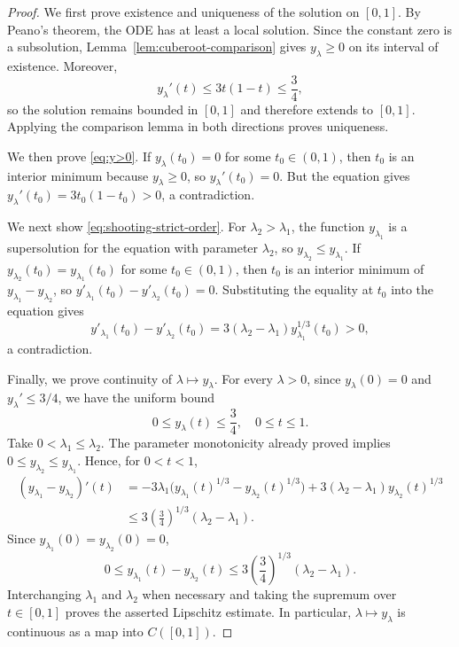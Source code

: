 \documentclass[a4paper,fleqn]{cas-sc}
\numberwithin{equation}{section}
\theoremstyle{plain}
\theoremstyle{definition}
\begin{document}
\begin{proof}
We first prove existence and uniqueness of the solution on $[0,1]$.  By
Peano's theorem, the ODE has at least a local solution.  Since the constant
zero is a
subsolution, Lemma~\ref{lem:cuberoot-comparison} gives \(y_\lambda\ge0\) on its
interval of existence.  Moreover,
\[
 y_\lambda'(t)\le3t(1-t)\le\frac34,
\]
so the solution remains bounded in \([0,1]\) and therefore extends to \([0,1]\).  Applying
the comparison lemma in both directions proves uniqueness.

We then prove \eqref{eq:y>0}.  If
\(y_\lambda(t_0)=0\) for some \(t_0\in(0,1)\), then \(t_0\) is an interior
minimum because $y_\lambda\ge0$, so $y_\lambda'(t_0)=0$.  But the
equation gives
\(y_\lambda'(t_0)=3t_0(1-t_0)>0\), a contradiction.

We next show \eqref{eq:shooting-strict-order}.
For $\lambda_2>\lambda_1$, the function $y_{\lambda_1}$ is a
supersolution for the equation with parameter $\lambda_2$, so
$y_{\lambda_2}\le y_{\lambda_1}$.  If
$y_{\lambda_2}(t_0)=y_{\lambda_1}(t_0)$ for some $t_0\in(0,1)$, then $t_0$
is an interior minimum of $y_{\lambda_1}-y_{\lambda_2}$, so
$y'_{\lambda_1}(t_0)-y'_{\lambda_2}(t_0)=0$.  Substituting the equality at
$t_0$ into the equation gives
\[
 y'_{\lambda_1}(t_0)-y'_{\lambda_2}(t_0)
 =3(\lambda_2-\lambda_1)y_{\lambda_1}^{1/3}(t_0)>0,
\]
a contradiction.

Finally, we prove continuity of $\lambda\mapsto y_\lambda$.  For every
$\lambda>0$, since
\(y_\lambda(0)=0\) and \(y_\lambda'\le3/4\), we have the uniform bound
\[
 0\le y_\lambda(t)\le\frac34,
 \quad 0\le t\le1.
\]
Take \(0<\lambda_1\le\lambda_2\).  The parameter monotonicity
already proved implies \(0\le y_{\lambda_2}\le y_{\lambda_1}\).  Hence, for \(0<t<1\),
\[
\begin{aligned}
 (y_{\lambda_1}-y_{\lambda_2})'(t)
 &=-3\lambda_1\bigl(y_{\lambda_1}(t)^{1/3}-y_{\lambda_2}(t)^{1/3}\bigr)
   +3(\lambda_2-\lambda_1)y_{\lambda_2}(t)^{1/3}\\
 &\le 3\left(\frac34\right)^{1/3}(\lambda_2-\lambda_1).
\end{aligned}
\]
Since
\(y_{\lambda_1}(0)=y_{\lambda_2}(0)=0\),
\[
 0\le y_{\lambda_1}(t)-y_{\lambda_2}(t)
 \le 3\left(\frac34\right)^{1/3}(\lambda_2-\lambda_1).
\]
Interchanging \(\lambda_1\) and \(\lambda_2\) when necessary and taking the
supremum over \(t\in[0,1]\) proves the asserted Lipschitz estimate.  In
particular, \(\lambda\mapsto y_\lambda\) is continuous as a map into
\(C([0,1])\).
\end{proof}
\end{document}
